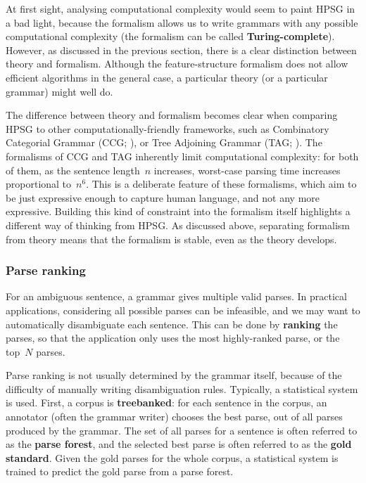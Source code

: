 \documentclass[output=paper]{langsci/langscibook}
\begin{document}
At first sight, analysing computational complexity
would seem to paint HPSG in a bad light,
because the formalism allows us to write grammars
with any possible computational complexity
(the formalism can be called \textbf{Turing-complete}).
However, as discussed in the previous section,
there is a clear distinction between theory and formalism.
Although the feature-structure formalism does not allow efficient algorithms in the general case,
a particular theory (or a particular grammar) might well do.


The difference between theory and formalism
becomes clear when comparing HPSG to other computationally-friendly frameworks,
such as Combinatory Categorial Grammar (CCG; \citealp{FIXME-Steedman-and-Baldridge}),
or Tree Adjoining Grammar (TAG; \citealp{FIXME-Joshi}).
The formalisms of CCG and TAG inherently limit computational complexity:
for both of them, as the sentence length~$n$ increases,
worst-case parsing time increases proportional to~$n^6$.
This is a deliberate feature of these formalisms,
which aim to be just expressive enough to capture human language,
and not any more expressive.
Building this kind of constraint into the formalism itself
highlights a different way of thinking from HPSG.
As discussed above, separating formalism from theory
means that the formalism is stable, even as the theory develops.




\subsubsection{Parse ranking}


For an ambiguous sentence,
a grammar gives multiple valid parses.
In practical applications, considering all possible parses can be infeasible,
and we may want to automatically disambiguate each sentence.
This can be done by \textbf{ranking} the parses,
so that the application only uses the most highly-ranked parse,
or the top~$N$ parses.

Parse ranking is not usually determined by the grammar itself,
because of the difficulty of manually writing disambiguation rules.
Typically, a statistical system is used.
First, a corpus is \textbf{treebanked}:
for each sentence in the corpus,
an annotator (often the grammar writer) chooses the best parse,
out of all parses produced by the grammar.
The set of all parses for a sentence is often referred to as the \textbf{parse forest},
and the selected best parse is often referred to as the \textbf{gold standard}.
Given the gold parses for the whole corpus, a statistical system is trained
to predict the gold parse from a parse forest.
\end{document}
